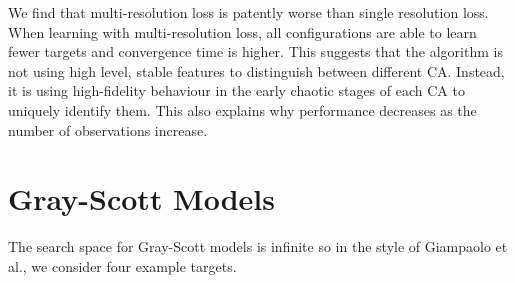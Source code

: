 \begin{table}
    \centering\hfill
    \hfill
    \hfill
\end{table}

We find that multi-resolution loss is patently worse than single resolution loss. When learning with multi-resolution loss, all configurations are able to learn fewer targets and convergence time is higher. This suggests that the algorithm is not using high level, stable features to distinguish between different CA. Instead, it is using high-fidelity behaviour in the early chaotic stages of each CA to uniquely identify them. This also explains why performance decreases as the number of observations increase.


\section{Gray-Scott Models}

The search space for Gray-Scott models is infinite so in the style of Giampaolo et al.\cite{giampaolo2022physics}, we consider four example targets.

